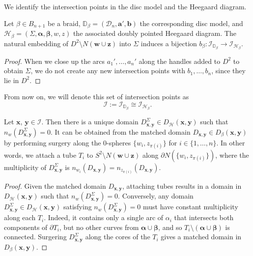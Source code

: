 \documentclass[11pt]{amsart}
\numberwithin{equation}{section}
\numberwithin{figure}{section}
\theoremstyle{definition}
\newcommand{\cD}{\mathcal{D}}
\newcommand{\cH}{\mathcal{H}}
\newcommand{\cI}{\mathcal{I}}
\newcommand{\bD}{\mathbb{D}}
\newcommand{\as}{\boldsymbol{\alpha}}
\newcommand{\bs}{\boldsymbol{\beta}}
\newcommand{\ba}{\boldsymbol{a}}
\newcommand{\bb}{\boldsymbol{b}}
\newcommand{\ws}{\boldsymbol{w}}
\newcommand{\xs}{\boldsymbol{x}}
\newcommand{\ys}{\boldsymbol{y}}
\newcommand{\zs}{\boldsymbol{z}}
\begin{document}
We identify the intersection points in the disc model and the Heegaard diagram.

\begin{prop}
   Let $\beta \in B_{n+1}$ be a braid, $\bD_\beta = (\cD_n, \ba', \bb)$ the corresponding disc model, and $\cH_\beta = (\Sigma, \as, \bs, w, z)$ the associated doubly pointed Heegaard diagram. The natural embedding of $D^2 \setminus N(\ws \cup \zs)$ into $\Sigma$ induces a bijection $b_\beta \colon \cI_{\bD_\beta} \to \cI_{\cH_\beta}$.
\end{prop}

\begin{proof}
When we close up the arcs $a_1', \dots, a_n'$ along the handles added to $D^2$ to obtain $\Sigma$, we do not create any new intersection points with $b_1, \dots, b_n$, since they lie in $D^2$.
\end{proof}

\begin{notation}
From now on, we will denote this set of intersection points as
\begin{equation}
    \cI :=\cI_{\bD_\beta} \cong \cI_{\cH_\beta}.
\end{equation}
\end{notation}

\begin{prop} \label{prop:domain-correspondence}
    Let $\xs$, $\ys \in \cI$. Then there is a unique domain $D^\Sigma_{\xs,\ys} \in D_{\cH}(\xs,\ys)$ such that $n_w(D^\Sigma_{\xs,\ys}) = 0$. It can be obtained from the matched domain $D_{\xs,\ys} \in D_{\beta}(\xs,\ys)$ by performing surgery along the 0-spheres $\{w_i, z_{\pi(i)}\}$ for $i \in \{1,\dots,n\}$. In other words, we attach a tube $T_i$ to $S^2 \setminus N(\ws \cup \zs)$ along $\partial N(\{w_i, z_{\pi(i)}\})$, where the multiplicity of $D^\Sigma_{\xs,\ys}$ is $n_{w_i}(D_{\xs,\ys}) = n_{z_{\pi(i)}}(D_{\xs,\ys})$.
\end{prop}

\begin{proof}
    Given the matched domain $D_{\xs,\ys}$, attaching tubes results in a domain in $D_{\cH}(\xs,\ys)$ such that $n_w(D^\Sigma_{\xs,\ys}) = 0$. Conversely, any domain $D^\Sigma_{\xs,\ys} \in D_{\cH}(\xs,\ys)$ satisfying $n_w(D^\Sigma_{\xs,\ys}) = 0$ must have constant multiplicity along each $T_i$. Indeed, it contains only a single arc of $\alpha_i$ that intersects both components of $\partial T_i$, but no other curves from $\as \cup \bs$, and so $T_i \setminus (\as \cup \bs)$ is connected. Surgering $D^\Sigma_{\xs,\ys}$ along the cores of the $T_i$ gives a matched domain in $D_{\beta}(\xs,\ys)$.
\end{proof}
\end{document}
